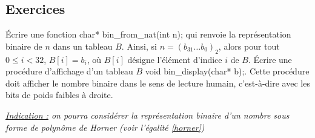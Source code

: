 \documentclass[../../../main.tex]{subfiles}
\begin{document}
\subsection{Exercices}
Écrire une fonction \textsf{char* bin\_from\_nat(int n);} qui renvoie la représentation binaire de $n$ dans un tableau $B$. Ainsi, si $n = (b_{31}\dots b_{0})_2$, alors pour tout $0 \leq i < 32$, $B[i] = b_i$, où $B[i]$ désigne l'élément d'indice $i$ de $B$. Écrire une procédure d'affichage d'un tableau $B$ \textsf{void bin\_display(char* b);}. Cette procédure doit afficher le nombre binaire dans le sens de lecture humain, c'est-à-dire avec les bits de poids faibles à droite.

\textit{\underline{Indication :} on pourra considérer la représentation binaire d'un nombre sous forme de polynôme de Horner (voir l'égalité \ref{horner})}
\end{document}
